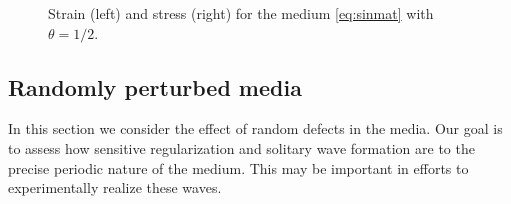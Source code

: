 \begin{figure}
\begin{center}
\caption{Strain (left) and stress (right) for the medium \eqref{eq:sinmat} with $\theta=1/2$. \label{fig:oop}}
\end{center}
\end{figure}

%
%
%



\subsection{Randomly perturbed media}
In this section we consider the effect of random defects in the media.
Our goal is to assess how sensitive regularization and solitary wave 
formation are to the precise periodic nature of the medium.  This may
be important in efforts to experimentally realize these waves.

